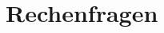 \documentclass[12pt,a4paper,ngerman]{article}
\begin{document}
\pagebreak



















































\pagebreak
\section*{Rechenfragen}





















 



   
\end{document}
